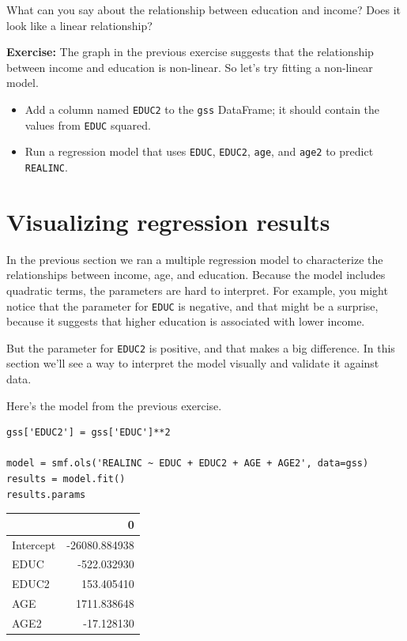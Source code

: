 What can you say about the relationship between education and income?
Does it look like a linear relationship?

\textbf{Exercise:} The graph in the previous exercise suggests that the
relationship between income and education is non-linear. So let's try
fitting a non-linear model.

\begin{itemize}
\item
  Add a column named \passthrough{\lstinline!EDUC2!} to the
  \passthrough{\lstinline!gss!} DataFrame; it should contain the values
  from \passthrough{\lstinline!EDUC!} squared.
\item
  Run a regression model that uses \passthrough{\lstinline!EDUC!},
  \passthrough{\lstinline!EDUC2!}, \passthrough{\lstinline!age!}, and
  \passthrough{\lstinline!age2!} to predict
  \passthrough{\lstinline!REALINC!}.
\end{itemize}

\hypertarget{visualizing-regression-results}{%
\section{Visualizing regression
results}\label{visualizing-regression-results}}

In the previous section we ran a multiple regression model to
characterize the relationships between income, age, and education.
Because the model includes quadratic terms, the parameters are hard to
interpret. For example, you might notice that the parameter for
\passthrough{\lstinline!EDUC!} is negative, and that might be a
surprise, because it suggests that higher education is associated with
lower income.

But the parameter for \passthrough{\lstinline!EDUC2!} is positive, and
that makes a big difference. In this section we'll see a way to
interpret the model visually and validate it against data.

Here's the model from the previous exercise.

\begin{lstlisting}[]
gss['EDUC2'] = gss['EDUC']**2

model = smf.ols('REALINC ~ EDUC + EDUC2 + AGE + AGE2', data=gss)
results = model.fit()
results.params
\end{lstlisting}

\begin{tabular}{lr}
\midrule
{} &             0 \\
\midrule
Intercept & -26080.884938 \\
EDUC      &   -522.032930 \\
EDUC2     &    153.405410 \\
AGE       &   1711.838648 \\
AGE2      &    -17.128130 \\
\midrule
\end{tabular}

